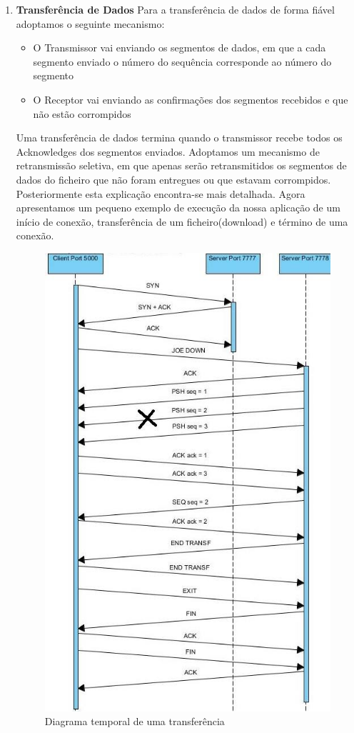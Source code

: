 \documentclass{article}
\begin{document}
\begin{enumerate}
\item \textbf{Transferência de Dados}
Para a transferência de dados de forma fiável adoptamos o seguinte mecanismo:
\begin{itemize}
\item O Transmissor vai enviando os segmentos de dados, em que a cada segmento enviado o número do sequência corresponde ao número do segmento
\item O Receptor vai enviando as confirmações dos segmentos recebidos e que não estão corrompidos
\end{itemize}
Uma transferência de dados termina quando o transmissor recebe todos os Acknowledges dos segmentos enviados. Adoptamos um mecanismo de retransmissão seletiva, em
que apenas serão retransmitidos os segmentos de dados do ficheiro que não foram entregues ou que estavam corrompidos. Posteriormente esta explicação
encontra-se mais detalhada.
Agora apresentamos um pequeno exemplo de execução da nossa aplicação de um início de conexão, transferência de um ficheiro(download) e término de uma conexão.
\begin{figure}[H]
\centering
\includegraphics[scale=0.45]{img/diagram.jpg}
\caption{Diagrama temporal de uma transferência}
\end{figure}


\end{enumerate}
\end{document}
